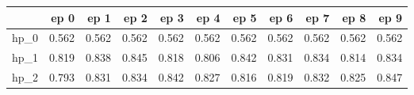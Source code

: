\begin{tabular}{lrrrrrrrrrr}
\toprule
{} &   ep 0 &   ep 1 &   ep 2 &   ep 3 &   ep 4 &   ep 5 &   ep 6 &   ep 7 &   ep 8 &   ep 9 \\
\midrule
hp\_0 &  0.562 &  0.562 &  0.562 &  0.562 &  0.562 &  0.562 &  0.562 &  0.562 &  0.562 &  0.562 \\
hp\_1 &  0.819 &  0.838 &  0.845 &  0.818 &  0.806 &  0.842 &  0.831 &  0.834 &  0.814 &  0.834 \\
hp\_2 &  0.793 &  0.831 &  0.834 &  0.842 &  0.827 &  0.816 &  0.819 &  0.832 &  0.825 &  0.847 \\
\bottomrule
\end{tabular}
